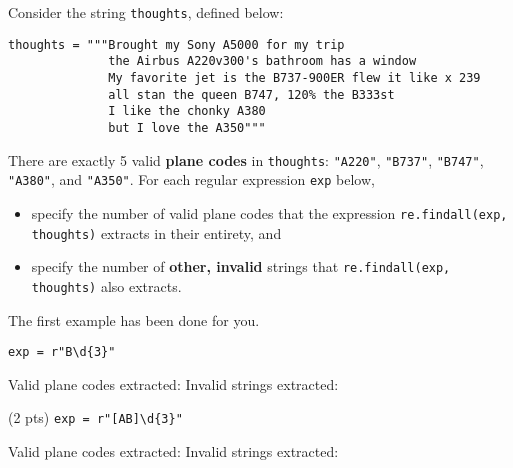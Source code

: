 \documentclass[twoside,12pt]{article}
\begin{document}
\begin{probset}
\begin{prob}[(10 pts)]
\begin{prob}[(4 pts)]
\end{prob}


\newpage

\begin{prob}[(8 pts)]

Consider the string \texttt{thoughts}, defined below:

\begin{verbatim}
thoughts = """Brought my Sony A5000 for my trip
              the Airbus A220v300's bathroom has a window
              My favorite jet is the B737-900ER flew it like x 239
              all stan the queen B747, 120% the B333st
              I like the chonky A380
              but I love the A350"""
\end{verbatim}

There are exactly 5 valid \textbf{plane codes} in \texttt{thoughts}: \texttt{"A220"}, \texttt{"B737"}, \texttt{"B747"}, \texttt{"A380"}, and \texttt{"A350"}. For each regular expression \texttt{exp} below,
\begin{itemize}
    \item specify the number of valid plane codes that the expression \texttt{re.findall(exp, thoughts)} extracts in their entirety, and
    \item specify the number of \textbf{other, invalid} strings that \texttt{re.findall(exp, thoughts)} also extracts.
\end{itemize}
The first example has been done for you.

\begin{subprobset}

\begin{subprob} \verb|exp = r"B\d{3}"|

Valid plane codes extracted:  \hspace{0.3in} Invalid strings extracted: 
    
\end{subprob}
\vspace{0.2in}

\begin{subprob}(2 pts) \verb|exp = r"[AB]\d{3}"|

Valid plane codes extracted:  \hspace{0.3in} Invalid strings extracted: 
    
\end{subprob}
\vspace{0.2in}


\end{subprobset}
\end{prob}
\end{prob}
\end{probset}
\end{document}

